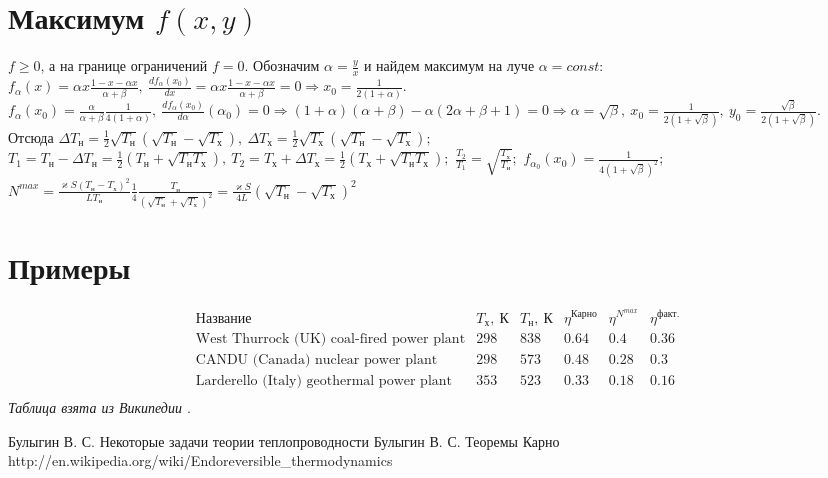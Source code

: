 \documentclass[a4paper]{article}
\begin{document}
\section{Максимум $f(x,y)$}
\label{maxsection}
$f\geq 0$, а на границе ограничений $f=0$. Обозначим $\alpha=\frac{y}{x}$ и найдем максимум на луче $\alpha=const$:\newline
$
f_\alpha(x)=\alpha x \frac{1-x-\alpha x}{\alpha + \beta},\ \frac{df_\alpha(x_0)}{dx}=\alpha x \frac{1-x-\alpha x}{\alpha + \beta}=0 \Longrightarrow x_0=\frac{1}{2(1+\alpha)}$.\newline
$f_\alpha(x_0)=\frac{\alpha}{\alpha + \beta}\frac{1}{4(1+\alpha)},\ 
\frac{df_\alpha(x_0)}{d\alpha}(\alpha_0)=0\Longrightarrow (1+\alpha)(\alpha+\beta)-\alpha(2\alpha+\beta+1)=0\Longrightarrow\alpha=\sqrt{\beta},\ 
x_0=\frac{1}{2(1+\sqrt{\beta})},\ y_0=\frac{\sqrt{\beta}}{2(1+\sqrt{\beta})}.$\newline
Отсюда\newline
$ %
\Delta T_{\text{н}}=\frac{1}{2}\sqrt{T_{\text{н}}}(\sqrt{T_{\text{н}}}-\sqrt{T_{\text{х}}}),\ 
\Delta T_{\text{х}}=\frac{1}{2}\sqrt{T_{\text{х}}}(\sqrt{T_{\text{н}}}-\sqrt{T_{\text{х}}});
$\newline 
$
T_1=T_{\text{н}}-\Delta T_{\text{н}}=\frac{1}{2}(T_{\text{н}}+\sqrt{T_{\text{н}}T_{\text{х}}}),\ 
T_2=T_{\text{х}}+\Delta T_{\text{х}}=\frac{1}{2}(T_{\text{х}}+\sqrt{T_{\text{н}}T_{\text{х}}});
$\newline
$\frac{T_2}{T_1}=\sqrt{\frac{T_{\text{х}}}{T_{\text{н}}}};$\newline
$f_{\alpha_0}(x_0)=\frac{1}{4(1+\sqrt{\beta})^2};$\newline
$N^{max}=\frac{\varkappa S(T_{\text{н}}-T_{\text{х}})^2}{LT_{\text{н}}}\frac{1}{4}\frac{T_{\text{н}}}{(\sqrt{T_{\text{н}}}+\sqrt{T_{\text{х}}})^2}=
\frac{\varkappa S}{4L}(\sqrt{T_{\text{н}}}-\sqrt{T_{\text{х}}})^2$
\section{Примеры}
\label{exsection}
$$
\begin{array}{llllll}
\text{Название} & T_{\text{х}},\ \text{К} & T_{\text{н}},\ \text{К} & \eta^{\text{Карно}} & \eta^{N^{max}} & \eta^{\text{факт.}}\\
\text{West Thurrock (UK) coal-fired power plant} & 298 & 838 & 0.64 & 0.4 & 0.36\\
\text{CANDU (Canada) nuclear power plant} & 298 & 573 & 0.48 & 0.28 & 0.3\\
\text{Larderello (Italy) geothermal power plant} & 353 & 523 & 0.33 & 0.18 & 0.16\\
\end{array}
$$
\newline
{\em Таблица взята из Википедии \cite{w1}}.
\begin{thebibliography}{3}
 Булыгин В. С. Некоторые задачи теории теплопроводности
 Булыгин В. С. Теоремы Карно
\bibitem{w1} http://en.wikipedia.org/wiki/Endoreversible\_thermodynamics
\end{thebibliography}
\end{document}
